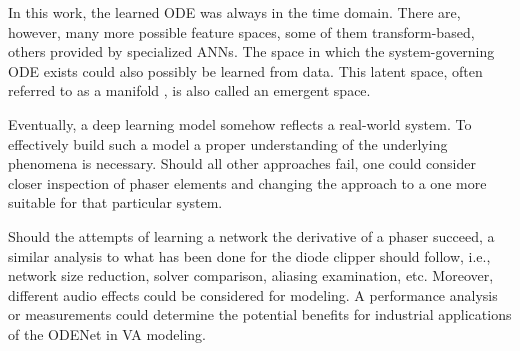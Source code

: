 In this work, the learned \ac{ODE} was always in the time domain. There are, however, many more possible feature spaces, some of them transform-based, others provided by specialized \acp{ANN}. %
The space in which the system-governing \ac{ODE} exists could also possibly be learned from data. This latent space, often referred to as a manifold \cite{Goodfellow-et-al-2016}, is also called an emergent space. %

Eventually, a deep learning model somehow reflects a real-world system. To effectively build such a model a proper understanding of the underlying phenomena is necessary. Should all other approaches fail, one could consider closer inspection of phaser elements and changing the approach to a one more suitable for that particular system.

Should the attempts of learning a network the derivative of a phaser succeed, a similar analysis to what has been done for the diode clipper should follow, i.e., network size reduction, solver comparison, aliasing examination, etc. Moreover, different audio effects could be considered for modeling. A performance analysis or measurements could determine the potential benefits for industrial applications of the ODENet in \ac{VA} modeling.
